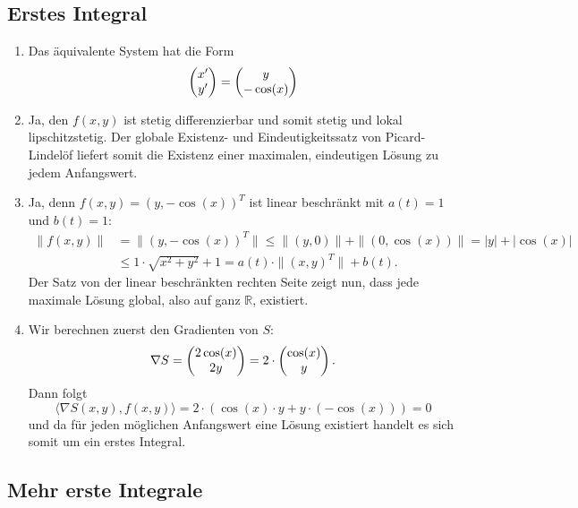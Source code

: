 \documentclass[a4paper]{article}
\begin{document}
\makeexheader

\subsection{Erstes Integral}

\begin{enumerate}[label=(\alph*)]
    \item Das äquivalente System hat die Form
    \begin{equation*}
        \left(\begin{matrix}x' \\ y'\end{matrix}\right) = \left(\begin{matrix}y \\ -\cos(x)\end{matrix}\right)
    \end{equation*}
    \item Ja, den $f(x,y)$ ist stetig differenzierbar und somit stetig und lokal lipschitzstetig. Der globale Existenz- und Eindeutigkeitssatz von Picard-Lindelöf liefert somit die Existenz einer maximalen, eindeutigen Lösung zu jedem Anfangswert.
    \item Ja, denn $f(x,y) = (y, -\cos(x))^T$ ist linear beschränkt mit $a(t) = 1$ und $b(t) = 1$:
    \begin{align*}
        \|f(x,y)\| &= \|(y, -\cos(x))^T\| \leq \| (y,0) \| + \|(0, \cos(x))\| = |y| + |\cos(x)|\\ &\leq 1 \cdot \sqrt{x^2 + y^2} + 1 = a(t) \cdot \|(x,y)^T\| + b(t)\text{.}
    \end{align*}
    Der Satz von der linear beschränkten rechten Seite zeigt nun, dass jede maximale Lösung global, also auf ganz $\mathds{R}$, existiert.
    \item Wir berechnen zuerst den Gradienten von $S$:
    \begin{equation*}
        \nabla S = \left(\begin{matrix}2 \cos (x) \\ 2 y\end{matrix}\right) = 2 \cdot \left(\begin{matrix}\cos(x) \\ y\end{matrix}\right)\text{.}
    \end{equation*}
    Dann folgt
    \begin{equation*}
        \langle \nabla S(x,y), f(x,y) \rangle = 2 \cdot (\cos(x) \cdot y + y \cdot (-\cos(x))) = 0
    \end{equation*}
    und da für jeden möglichen Anfangswert eine Lösung existiert handelt es sich somit um ein erstes Integral.
\end{enumerate}

\subsection{Mehr erste Integrale}
\end{document}
